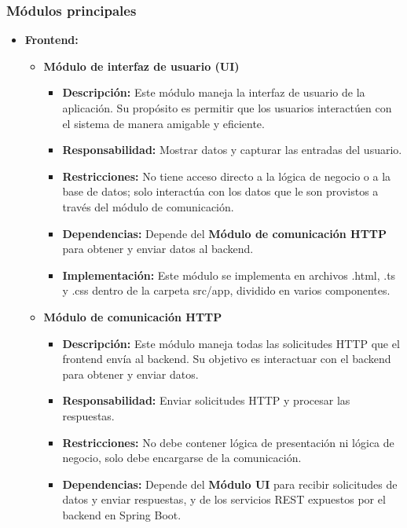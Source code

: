 \documentclass{article} %
\begin{document}
    \subsubsection{Módulos principales}
    \begin{itemize}
        \item \textbf{Frontend:} 
        \begin{itemize}
            \item \textbf{Módulo de interfaz de usuario (UI)}
                \begin{itemize}
                    \item \textbf{Descripción:} Este módulo maneja la interfaz de usuario de la aplicación. Su propósito es permitir que los usuarios interactúen con el sistema de manera amigable y eficiente.
                    \item \textbf{Responsabilidad:} Mostrar datos y capturar las entradas del usuario.
                    \item \textbf{Restricciones:} No tiene acceso directo a la lógica de negocio o a la base de datos; solo interactúa con los datos que le son provistos a través del módulo de comunicación.
                    \item \textbf{Dependencias:} Depende del \textbf{Módulo de comunicación HTTP} para obtener y enviar datos al backend.
                    \item \textbf{Implementación:} Este módulo se implementa en archivos .html, .ts y .css dentro de la carpeta src/app, dividido en varios componentes.
                \end{itemize}
            \item \textbf{Módulo de comunicación HTTP}
                \begin{itemize}
                    \item \textbf{Descripción:} Este módulo maneja todas las solicitudes HTTP que el frontend envía al backend. Su objetivo es interactuar con el backend para obtener y enviar datos.
                    \item \textbf{Responsabilidad:} Enviar solicitudes HTTP y procesar las respuestas.
                    \item \textbf{Restricciones:} No debe contener lógica de presentación ni lógica de negocio, solo debe encargarse de la comunicación.
                    \item \textbf{Dependencias:} Depende del \textbf{Módulo UI} para recibir solicitudes de datos y enviar respuestas, y de los servicios REST expuestos por el backend en Spring Boot.

\end{itemize}
\end{itemize}
\end{itemize}
\end{document}
